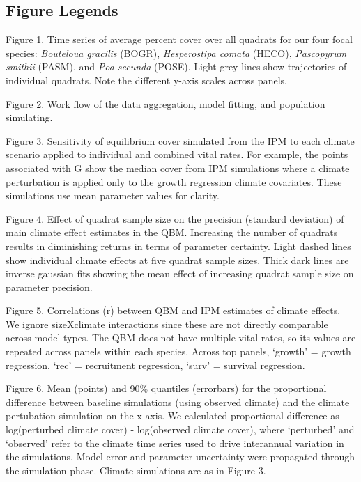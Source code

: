 \documentclass[12pt,]{article}
\begin{document}
\pagebreak{}

\subsection{Figure Legends}\label{figure-legends}

Figure 1. Time series of average percent cover over all quadrats for our
four focal species: \emph{Bouteloua gracilis} (BOGR), \emph{Hesperostipa
comata} (HECO), \emph{Pascopyrum smithii} (PASM), and \emph{Poa secunda}
(POSE). Light grey lines show trajectories of individual quadrats. Note
the different y-axis scales across panels.

Figure 2. Work flow of the data aggregation, model fitting, and
population simulating.

Figure 3. Sensitivity of equilibrium cover simulated from the IPM to
each climate scenario applied to individual and combined vital rates.
For example, the points associated with G show the median cover from IPM
simulations where a climate perturbation is applied only to the growth
regression climate covariates. These simulations use mean parameter
values for clarity.

Figure 4. Effect of quadrat sample size on the precision (standard
deviation) of main climate effect estimates in the QBM. Increasing the
number of quadrats results in diminishing returns in terms of parameter
certainty. Light dashed lines show individual climate effects at five
quadrat sample sizes. Thick dark lines are inverse gaussian fits showing
the mean effect of increasing quadrat sample size on parameter
precision.

Figure 5. Correlations (r) between QBM and IPM estimates of climate
effects. We ignore sizeXclimate interactions since these are not
directly comparable across model types. The QBM does not have multiple
vital rates, so its values are repeated across panels within each
species. Across top panels, `growth' = growth regression, `rec' =
recruitment regression, `surv' = survival regression.

Figure 6. Mean (points) and 90\% quantiles (errorbars) for the
proportional difference between baseline simulations (using observed
climate) and the climate pertubation simulation on the x-axis. We
calculated proportional difference as log(perturbed climate cover) -
log(observed climate cover), where `perturbed' and `observed' refer to
the climate time series used to drive interannual variation in the
simulations. Model error and parameter uncertainty were propagated
through the simulation phase. Climate simulations are as in Figure 3.
\end{document}
